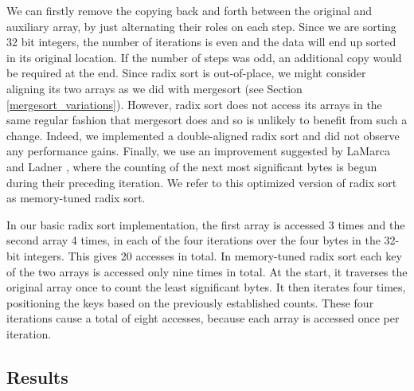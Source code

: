 \documentclass[acmtocl]{acmtrans2m}
\begin{document}
We can firstly remove the copying back and forth between the original and auxiliary array, by just alternating their roles on each step. Since we are
sorting 32 bit integers, the number of iterations is even and the data will end up sorted in its original location. If the number of steps was odd, an
additional copy would be required at the end. Since radix sort is out-of-place, we might consider aligning its two arrays as we did with mergesort (see
Section \ref{mergesort_variations}). However, radix sort does not access its arrays in the same regular fashion that mergesort does and so is unlikely to
benefit from such a change. Indeed, we implemented a double-aligned radix sort and did not observe any performance gains.
Finally, we use an improvement suggested by LaMarca and Ladner \citeyear{LaMarca97}, where the counting 
of the next most significant bytes is begun during their preceding iteration. We refer to this optimized version of radix sort as memory-tuned
radix sort.

In our basic radix sort implementation, the first array is accessed 3 times and the second array 4 times, in each of the four
iterations over the four bytes in the 32-bit integers. This gives 20 accesses in total.
In memory-tuned radix sort each key of the two arrays is accessed only nine times in total.
At the start, it traverses the original array once to count the least significant bytes. It then iterates four times, positioning
the keys based on the previously established counts. These four iterations cause
a total of eight accesses, because each array is accessed once per iteration.

\subsection{Results}
\end{document}
